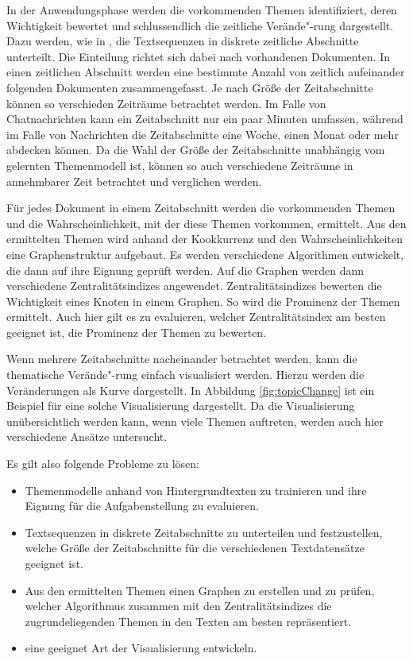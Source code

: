 In der Anwendungsphase werden die vorkommenden Themen identifiziert, deren Wichtigkeit bewertet und schlussendlich die zeitliche Verände"-rung dargestellt. Dazu werden, wie in \citet{shafferEpistemicFrames}, die Textsequenzen in diskrete zeitliche Abschnitte unterteilt. Die Einteilung richtet sich dabei nach vorhandenen Dokumenten. In einen zeitlichen Abschnitt werden eine bestimmte Anzahl von zeitlich aufeinander folgenden Dokumenten zusammengefasst. Je nach Größe der Zeitabschnitte können so verschieden Zeiträume betrachtet werden. Im Falle von Chatnachrichten kann ein Zeitabschnitt nur ein paar Minuten umfassen, während im Falle von Nachrichten die Zeitabschnitte eine Woche, einen Monat oder mehr abdecken können. Da die Wahl der Größe der Zeitabschnitte unabhängig vom gelernten Themenmodell ist, können so auch verschiedene Zeiträume in annehmbarer Zeit betrachtet und verglichen werden. 

Für jedes Dokument in einem Zeitabschnitt werden die vorkommenden Themen und die Wahrscheinlichkeit, mit der diese Themen vorkommen, ermittelt. Aus den ermittelten Themen wird anhand der Kookkurrenz und den Wahrscheinlichkeiten eine Graphenstruktur aufgebaut. Es werden verschiedene Algorithmen entwickelt, die dann auf ihre Eignung geprüft werden. Auf die Graphen werden dann verschiedene Zentralitätsindizes angewendet. Zentralitätsindizes bewerten die Wichtigkeit eines Knoten in einem Graphen. So wird die Prominenz der Themen ermittelt. Auch hier gilt es zu evaluieren, welcher Zentralitätsindex am besten geeignet ist, die Prominenz der Themen zu bewerten. 

Wenn mehrere Zeitabschnitte nacheinander betrachtet werden, kann die thematische Verände"-rung einfach visualisiert werden. Hierzu werden die Veränderungen als Kurve dargestellt. In Abbildung \ref{fig:topicChange} ist ein Beispiel für eine solche Visualisierung dargestellt. Da die Visualisierung unübersichtlich werden kann, wenn viele Themen auftreten, werden auch hier verschiedene Ansätze untersucht.

Es gilt also folgende Probleme zu lösen: 
\begin{itemize} 
  \item Themenmodelle anhand von Hintergrundtexten zu trainieren und ihre Eignung für die Aufgabenstellung zu evaluieren.
  \item Textsequenzen in diskrete Zeitabschnitte zu unterteilen und festzustellen, welche Größe der Zeitabschnitte für die verschiedenen Textdatensätze geeignet ist.
  \item Aus den ermittelten Themen einen Graphen zu erstellen und zu prüfen, welcher Algorithmus zusammen mit den Zentralitätsindizes die zugrundeliegenden Themen in den Texten am besten repräsentiert.
  \item eine geeignet Art der Visualisierung entwickeln.
\end{itemize} 
